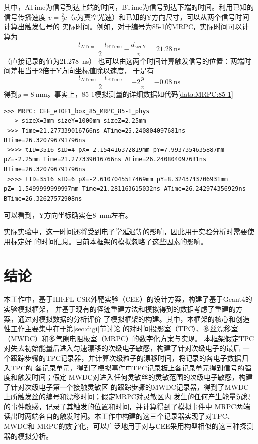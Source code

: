 \documentclass[bachelor,openany,oneside,color]{buaathesis}
\begin{document}
其中，ATime为信号到达上端的时间，BTime为信号到达下端的时间。利用已知的信号传播速度
$v=\frac23c$（$c$为真空光速）和已知的Y方向尺寸，可以从两个信号时间计算出触发信号的
实际时间。例如，对于编号为85-1的MRPC，实际时间可以计算为
\begin{equation}
\frac{t_{\text{ATime}}+t_{\text{BTime}} }{2}-\frac{d_{\text{sizeY}} }{v}
	=\SI{21.28}{\nano\second}
\end{equation}
（直接记录的值为\SI{21.278}{\nano\second}）
也可以由这两个时间计算触发信号的位置：两端时间差相当于2倍于Y方向坐标值除以速度，
于是有
\begin{equation}
\frac{t_{\text{ATime}}-t_{\text{BTime}} }{2}=-2\frac{y}{v}=\SI{-0.08}{\nano\second}
\end{equation}
得到$y=\SI{8}{\milli\meter}$。事实上，85-1模拟测量的详细数据如代码\ref{data:MRPC:85-1}
\begin{lstlisting}[caption={eTOF1-MRPC-85-1},label={data:MRPC:85-1},firstnumber=4449,lastline=4453]
 >>> MRPC: CEE_eTOF1_box_85_MRPC_85-1_phys
   > sizeX=3mm sizeY=1000mm sizeZ=2.25mm 
 >>> Time=21.277339016766ns ATime=26.240804097681ns BTime=26.320796791796ns
 >>>> tID=3516 sID=4 pX=-2.154416372819mm pY=7.9937354635887mm pZ=-2.25mm Time=21.277339016766ns ATime=26.240804097681ns BTime=26.320796791796ns
 >>>> tID=3516 sID=6 pX=-2.6107045517469mm pY=8.3243743706931mm pZ=-1.5499999999997mm Time=21.281163615032ns ATime=26.242974356929ns BTime=26.32627572908ns
\end{lstlisting}
可以看到，Y方向坐标确实在\SI{8}{\milli\meter}左右。

实际实验中，这一时间还将受到电子学延迟等的影响，因此用于实验分析时需要使用标定好
的时间信息。目前本框架的模拟忽略了这些因素的影响。


\chapter*{结论}
本工作中，基于HIRFL-CSR外靶实验（CEE）的设计方案，构建了基于Geant4的实验模拟框架，
并基于现有的径迹重建方法和模拟得到的数据考虑了重建的方案，通过对模拟数据的分析评价
了模拟框架的构建。其中，本框架的核心和创造性工作主要集中在于第\ref{sec:digi}节讨论
的对时间投影室（TPC）、多丝漂移室（MWDC）和多气隙电阻板室（MRPC）的数字化方案与实现。
本框架假定TPC对失去初始能量后进入匀速漂移的次级电子敏感，构建了针对次级电子的最后
一个跟踪步骤的TPC记录器，并计算次级粒子的漂移时间，将记录的各电子数据归入TPC的
各记录单元，得到了模拟事件中TPC记录板上各记录单元得到信号的强度和触发时间；假定
MWDC对进入任何灵敏丝的灵敏范围的次级电子敏感，构建了针对次级电子第一个接触灵敏区
的跟踪步骤的MWDC记录器，得到了MWDC上所触发丝的编号和漂移时间；假定MRPC对灵敏区内
发生的任何产生能量沉积的事件敏感，记录了其触发的位置和时间，并计算得到了模拟事件中
MRPC两端读出时两端各自的触发时间。本工作中构建的这三个记录器实现了对TPC、MWDC和
MRPC的数字化，可以广泛地用于对与CEE采用构型相似的这三种探测器的模拟分析。
\end{document}
